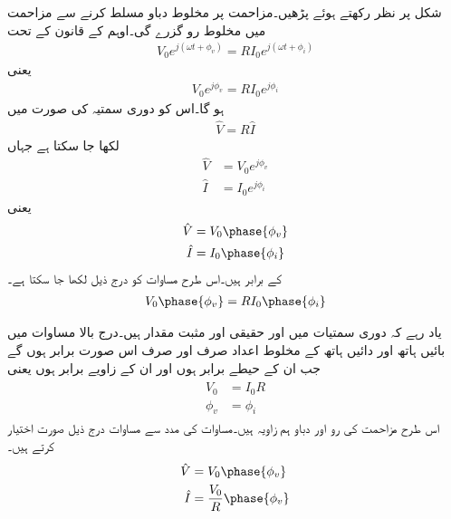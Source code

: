 شکل  پر نظر رکھتے ہوئے پڑھیں۔مزاحمت  پر مخلوط دباو  مسلط کرنے سے  مزاحمت میں مخلوط رو  گزرے گی۔اوہم کے قانون کے تحت
\begin{align*}
V_0 e^{j(\omega t +\phi_v)}=R I_0 e^{j(\omega t+\phi_i)}
\end{align*}
یعنی
\begin{align*}
V_0 e^{j\phi_v}=R I_0 e^{j\phi_i}
\end{align*}
ہو گا۔اس کو دوری سمتیہ کی صورت میں
\begin{align}\label{مساوات_بدلتا_مزاحمت_دوری_تعلق}
\hat{V}=R \hat{I}
\end{align}
لکھا جا سکتا ہے جہاں
\begin{align*}
\hat{V}&=V_0e^{j\phi_v}\\
\hat{I}&=I_0 e^{j \phi_i}
\end{align*}
یعنی
\begin{gather}
\begin{aligned}\label{مساوات_بدلتا_مزاحمت_دوری_تعلق_الف}
\hat{V}&=V_0 \phase{\phi_v}\\
\hat{I}&=I_0 \phase{\phi_i}
\end{aligned}
\end{gather}
کے برابر ہیں۔اس طرح مساوات  کو درج ذیل لکھا جا سکتا ہے۔
\begin{align*}
V_0 \phase{\phi_v} = R I_0 \phase{\phi_i}
\end{align*}

یاد رہے کہ دوری سمتیات میں  اور  حقیقی اور مثبت مقدار ہیں۔درج بالا مساوات میں بائیں ہاتھ اور دائیں ہاتھ کے مخلوط اعداد صرف اور صرف اس صورت برابر ہوں گے جب ان کے حیطے برابر ہوں اور ان کے زاویے برابر ہوں یعنی
\begin{gather}
\begin{aligned}\label{مساوات_بدلتا_مزاحمت_دوری_تعلق_ب}
V_0&=I_0 R\\
\phi_v&=\phi_i
\end{aligned}
\end{gather} 
اس طرح مزاحمت کی رو اور دباو ہم زاویہ ہیں۔مساوات  کی مدد سے مساوات  درج ذیل صورت اختیار کرتے ہیں۔
\begin{gather}
\begin{aligned}\label{مساوات_بدلتا_مزاحمت_دوری_تعلق_پ}
\hat{V}&=V_0\phase{\phi_v}\\
\hat{I}&=\frac{V_0}{R} \phase{\phi_v}
\end{aligned}
\end{gather}


